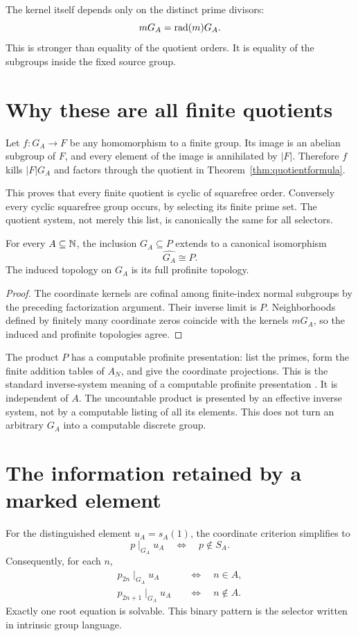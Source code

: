 The kernel itself depends only on the distinct prime divisors:
\[
mG_A=\operatorname{rad}(m)G_A.
\]
This is stronger than equality of the quotient orders. It is equality of the subgroups inside the fixed source group.

\section{Why these are all finite quotients}
Let $f:G_A\to F$ be any homomorphism to a finite group. Its image is an abelian subgroup of $F$, and every element of the image is annihilated by $\lvert F\rvert$. Therefore $f$ kills $\lvert F\rvert G_A$ and factors through the quotient in Theorem~\ref{thm:quotientformula}.

This proves that every finite quotient is cyclic of squarefree order. Conversely every cyclic squarefree group occurs, by selecting its finite prime set. The quotient system, not merely this list, is canonically the same for all selectors.

\begin{corollary}
\label{thm:GAcompletion}
For every $A\subseteq\mathbb N$, the inclusion $G_A\subseteq P$ extends to a canonical isomorphism
\[
\widehat{G_A}\cong P.
\]
The induced topology on $G_A$ is its full profinite topology.
\end{corollary}
\begin{proof}
The coordinate kernels are cofinal among finite-index normal subgroups by the preceding factorization argument. Their inverse limit is $P$. Neighborhoods defined by finitely many coordinate zeros coincide with the kernels $mG_A$, so the induced and profinite topologies agree.
\end{proof}
The product $P$ has a computable profinite presentation: list the primes, form the finite addition tables of $A_N$, and give the coordinate projections. This is the standard inverse-system meaning of a computable profinite presentation \cite[Definition 3.3]{Lupini}. It is independent of $A$. The uncountable product is presented by an effective inverse system, not by a computable listing of all its elements. This does not turn an arbitrary $G_A$ into a computable discrete group.

\section{The information retained by a marked element}
For the distinguished element $u_A=s_A(1)$, the coordinate criterion simplifies to
\begin{equation}
\label{eq:markroot}
p\mid_{G_A}u_A\quad\Longleftrightarrow\quad p\notin S_A.
\end{equation}
Consequently, for each $n$,
\begin{align}
 p_{2n}\mid_{G_A}u_A&\quad\Longleftrightarrow\quad n\in A,\label{eq:evenroot}\\
 p_{2n+1}\mid_{G_A}u_A&\quad\Longleftrightarrow\quad n\notin A.\label{eq:oddroot}
\end{align}
Exactly one root equation is solvable. This binary pattern is the selector written in intrinsic group language.


